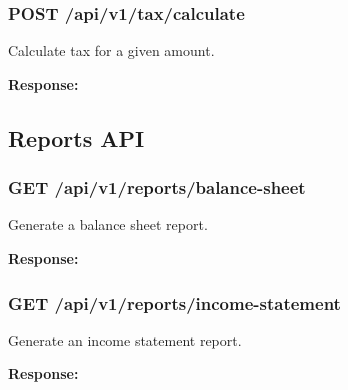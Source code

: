 \subsubsection{POST /api/v1/tax/calculate}\label{post-apiv1taxcalculate}

Calculate tax for a given amount.

\textbf{Response:}

\begin{Shaded}
\begin{Highlighting}[]
\FunctionTok{\{}
  \FunctionTok{:} \FunctionTok{,}
  \FunctionTok{:} \FunctionTok{,}
  \FunctionTok{:} 
\FunctionTok{\}}
\end{Highlighting}
\end{Shaded}

\subsection{Reports API}\label{reports-api}

\subsubsection{GET
/api/v1/reports/balance-sheet}\label{get-apiv1reportsbalance-sheet}

Generate a balance sheet report.

\textbf{Response:}

\begin{Shaded}
\begin{Highlighting}[]
\FunctionTok{\{}
  \FunctionTok{:} \FunctionTok{,}
  \FunctionTok{:} 
\FunctionTok{\}}
\end{Highlighting}
\end{Shaded}

\subsubsection{GET
/api/v1/reports/income-statement}\label{get-apiv1reportsincome-statement}

Generate an income statement report.

\textbf{Response:}

\begin{Shaded}
\begin{Highlighting}[]
\FunctionTok{\{}
  \FunctionTok{:} \FunctionTok{,}
  \FunctionTok{:} 
\FunctionTok{\}}
\end{Highlighting}
\end{Shaded}

